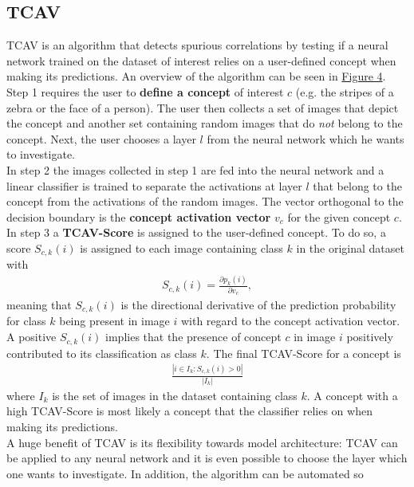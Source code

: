 \documentclass{article}
\begin{document}
\subsection{TCAV}
TCAV \cite{pmlr-v80-kim18d} is an algorithm that detects spurious correlations by testing if a neural network trained
on the dataset of interest relies on a user-defined concept when making its predictions. An overview of the algorithm
can be seen in \hyperref[fig:tcav]{Figure 4}. \\
Step 1 requires the user to \textbf{define a concept} of interest $c$ (e.g. the stripes of a zebra
or the face of a person). The user then collects a set of images that depict the concept and another set
containing random images that do \textit{not} belong to the concept. Next, the user chooses a layer $l$ from
the neural network which he wants to investigate. \\
In step 2 the images collected in step 1 are fed into the neural network and a linear classifier is trained
to separate the activations at layer $l$ that belong to the concept from the activations of the random images.
The vector orthogonal to the decision boundary is the \textbf{concept activation vector} $v_c$ for the given concept $c$.\\
In step 3 a \textbf{TCAV-Score} is assigned to the user-defined concept. To do so, a score $S_{c,k}(i)$
is assigned to each image containing class $k$ in the original dataset with 
\begin{align*}
    S_{c,k}(i) = \frac{\partial p_k(i)}{\partial v_c},
\end{align*}
meaning that $S_{c,k}(i)$ is the directional derivative of the prediction probability for class $k$ being present
in image $i$ with regard to the concept activation vector. A positive $S_{c,k}(i)$ implies that the presence of
concept $c$ in image $i$ positively contributed to its classification as class $k$.
The final TCAV-Score for a concept is 
\begin{align*}
    \frac{|i \in I_k: S_{c,k}(i) > 0 |}{|I_k|}
\end{align*}
where $I_k$ is the set of images
in the dataset containing class $k$. A concept with a high TCAV-Score is most likely a concept that the classifier
relies on when making its predictions. \\
A huge benefit of TCAV is its flexibility towards model architecture: TCAV can be applied to any neural network and
it is even possible to choose the layer which one wants to investigate. In addition, the algorithm can be automated so
\end{document}
